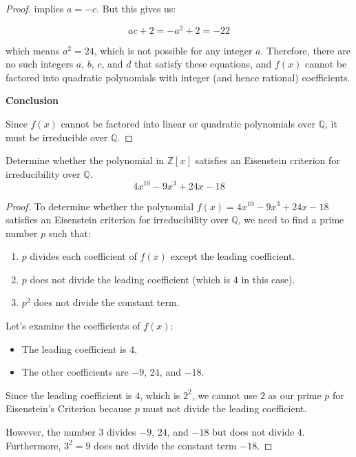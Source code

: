\documentclass[12pt]{amsart}
\theoremstyle{definition}
\numberwithin{equation}{section}
\theoremstyle{plain}
\newcommand{\Z}{\mathbb{Z}}
\newcommand{\Q}{\mathbb{Q}}
\begin{document}
\begin{exercise}{17}
\begin{proof}
implies \( a = -c \). But this gives us:

\[
ac + 2 = -a^2 + 2 = -22
\]

which means \( a^2 = 24 \), which is not possible for any integer \( a \). Therefore, there are no such integers \( a \), \( b \), \( c \), and \( d \) that satisfy these equations, and \( f(x) \) cannot be factored into quadratic polynomials with integer (and hence rational) coefficients.

\textbf{Conclusion}

Since \( f(x) \) cannot be factored into linear or quadratic polynomials over \( \mathbb{Q} \), it must be irreducible over \( \mathbb{Q} \).
\end{proof}
\end{exercise}

\begin{exercise}{20} Determine whether the polynomial in $\Z[x]$ satisfies an Eisenstein criterion for irreducibility over $\Q$.
    \[4x^{10} - 9x^3 + 24x - 18\]
    \begin{proof}
        To determine whether the polynomial \( f(x) = 4x^{10} - 9x^3 + 24x - 18 \) satisfies an Eisenstein criterion for irreducibility over \( \mathbb{Q} \), we need to find a prime number \( p \) such that:

\begin{enumerate}
    \item \( p \) divides each coefficient of \( f(x) \) except the leading coefficient.
    \item \( p \) does not divide the leading coefficient (which is \( 4 \) in this case).
    \item \( p^2 \) does not divide the constant term.
\end{enumerate}

Let's examine the coefficients of \( f(x) \):

\begin{itemize}
    \item The leading coefficient is \( 4 \).
    \item The other coefficients are \( -9 \), \( 24 \), and \( -18 \).
\end{itemize}

Since the leading coefficient is \( 4 \), which is \( 2^2 \), we cannot use \( 2 \) as our prime \( p \) for Eisenstein's Criterion because \( p \) must not divide the leading coefficient. 

However, the number \( 3 \) divides \( -9 \), \( 24 \), and \( -18 \) but does not divide \( 4 \). Furthermore, \( 3^2 = 9 \) does not divide the constant term \( -18 \). 


\end{proof}
\end{exercise}
\end{document}

